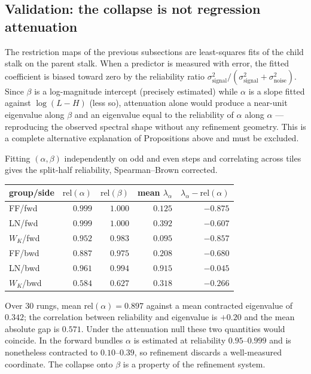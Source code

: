 \subsection{Validation: the collapse is not regression attenuation}
\label{sec:reliability}

The restriction maps of the previous subsections are least-squares fits of the
child stalk on the parent stalk. When a predictor is measured with error, the
fitted coefficient is biased toward zero by the reliability ratio
$\sigma^2_{\text{signal}}/(\sigma^2_{\text{signal}}+\sigma^2_{\text{noise}})$.
Since $\beta$ is a log-magnitude intercept (precisely estimated) while $\alpha$
is a slope fitted against $\log(L-H)$ (less so), attenuation alone would
produce a near-unit eigenvalue along $\beta$ and an eigenvalue equal to the
reliability of $\alpha$ along $\alpha$ --- reproducing the observed spectral
shape without any refinement geometry. This is a complete alternative
explanation of Propositions above and must be excluded.

Fitting $(\alpha,\beta)$ independently on odd and even steps and correlating
across tiles gives the split-half reliability, Spearman--Brown corrected.

\begin{center}
\begin{tabular}{lrrrr}
\toprule
group/side & $\mathrm{rel}(\alpha)$ & $\mathrm{rel}(\beta)$ & mean $\lambda_\alpha$ & $\lambda_\alpha - \mathrm{rel}(\alpha)$ \\
\midrule
FF/fwd    & $0.999$ & $1.000$ & $0.125$ & $-0.875$ \\
LN/fwd    & $0.999$ & $1.000$ & $0.392$ & $-0.607$ \\
$W_K$/fwd & $0.952$ & $0.983$ & $0.095$ & $-0.857$ \\
FF/bwd    & $0.887$ & $0.975$ & $0.208$ & $-0.680$ \\
LN/bwd    & $0.961$ & $0.994$ & $0.915$ & $-0.045$ \\
$W_K$/bwd & $0.584$ & $0.627$ & $0.318$ & $-0.266$ \\
\bottomrule
\end{tabular}
\end{center}

\begin{proposition}
Over $30$ rungs, mean $\mathrm{rel}(\alpha) = 0.897$ against a mean contracted
eigenvalue of $0.342$; the correlation between reliability and eigenvalue is
$+0.20$ and the mean absolute gap is $0.571$. Under the attenuation null these
two quantities would coincide. In the forward bundles $\alpha$ is estimated at
reliability $0.95$--$0.999$ and is nonetheless contracted to $0.10$--$0.39$, so
refinement discards a well-measured coordinate. The collapse onto $\beta$ is a
property of the refinement system.
\end{proposition}

